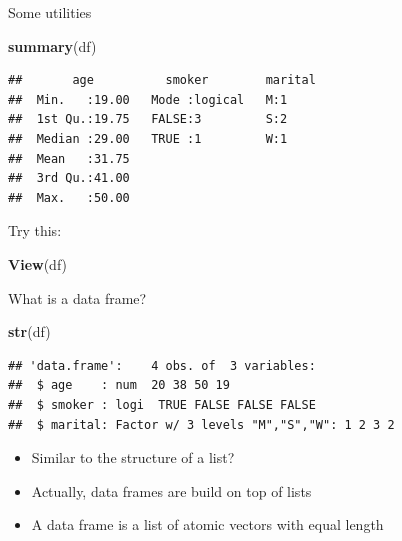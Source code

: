 \documentclass[ignorenonframetext,]{beamer}
\newenvironment{Shaded}{\begin{snugshade}}{\end{snugshade}}
\newcommand{\KeywordTok}[1]{\textcolor[rgb]{0.13,0.29,0.53}{\textbf{#1}}}
\newcommand{\NormalTok}[1]{#1}
\providecommand{\tightlist}{%
  \setlength{\itemsep}{0pt}\setlength{\parskip}{0pt}}
\begin{document}
\begin{frame}[fragile]{Some utilities}
\protect\hypertarget{some-utilities}{}

\begin{Shaded}
\begin{Highlighting}[]
\KeywordTok{summary}\NormalTok{(df)}
\end{Highlighting}
\end{Shaded}

\begin{verbatim}
##       age          smoker        marital
##  Min.   :19.00   Mode :logical   M:1    
##  1st Qu.:19.75   FALSE:3         S:2    
##  Median :29.00   TRUE :1         W:1    
##  Mean   :31.75                          
##  3rd Qu.:41.00                          
##  Max.   :50.00
\end{verbatim}

Try this:

\begin{Shaded}
\begin{Highlighting}[]
\KeywordTok{View}\NormalTok{(df)}
\end{Highlighting}
\end{Shaded}

\end{frame}

\begin{frame}[fragile]{What is a data frame?}
\protect\hypertarget{what-is-a-data-frame-1}{}

\begin{Shaded}
\begin{Highlighting}[]
\KeywordTok{str}\NormalTok{(df)}
\end{Highlighting}
\end{Shaded}

\begin{verbatim}
## 'data.frame':    4 obs. of  3 variables:
##  $ age    : num  20 38 50 19
##  $ smoker : logi  TRUE FALSE FALSE FALSE
##  $ marital: Factor w/ 3 levels "M","S","W": 1 2 3 2
\end{verbatim}

\begin{itemize}
\tightlist
\item
  Similar to the structure of a list?
\item
  Actually, data frames are build on top of lists
\item
  A data frame is a list of atomic vectors with equal length
\end{itemize}

\end{frame}
\end{document}
